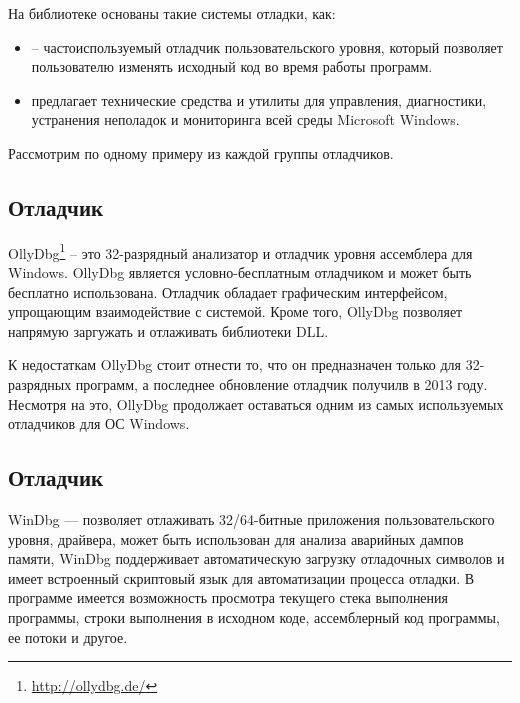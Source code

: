 На библиотеке  основаны такие системы отладки, как:
\begin{itemize}
	\item {} -- частоиспользуемый отладчик пользовательского уровня, который позволяет пользователю изменять исходный код во время работы программ.
	\item {} предлагает технические средства и утилиты для управления, диагностики, устранения неполадок и мониторинга всей среды Microsoft Windows.
\end{itemize}

Рассмотрим по одному примеру из каждой группы отладчиков.

\subsection{Отладчик }

OllyDbg\footnote{\url{http://ollydbg.de/}} -- это 32-разрядный анализатор и отладчик уровня ассемблера для Windows. OllyDbg является условно-бесплатным отладчиком и может быть бесплатно использована. Отладчик обладает графическим интерфейсом, упрощающим взаимодействие с системой. Кроме того, OllyDbg позволяет напрямую заргужать и отлаживать библиотеки DLL.

К недостаткам OllyDbg стоит отнести то, что он предназначен только для 32-разрядных программ, а последнее обновление отладчик получилв в 2013 году. Несмотря на это, OllyDbg продолжает оставаться одним из самых используемых отладчиков для ОС Windows.

\subsection{Отладчик }

WinDbg — позволяет отлаживать 32/64-битные приложения пользовательского уровня, драйвера, может быть использован для анализа аварийных дампов памяти, WinDbg поддерживает автоматическую загрузку отладочных символов и имеет встроенный скриптовый язык для автоматизации процесса отладки. В программе имеется возможность просмотра текущего стека выполнения программы, строки выполнения в исходном коде, ассемблерный код программы, ее потоки и другое.

